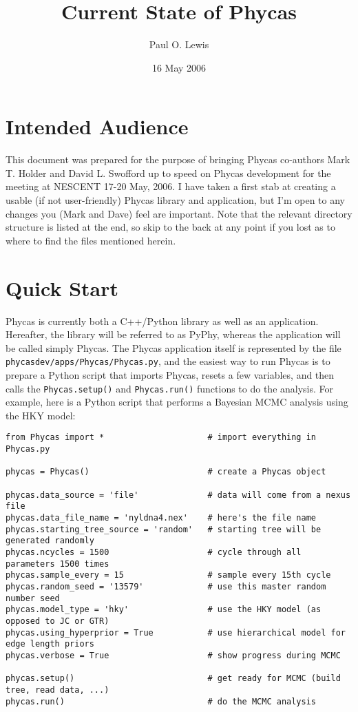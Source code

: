 \documentclass[10pt]{article}
\begin{document}
\title{Current State of Phycas}
\author{Paul O. Lewis} 
\date{16 May 2006}
\maketitle

\section{Intended Audience}

This document was prepared for the purpose of bringing Phycas co-authors Mark T. Holder and David L. Swofford up to speed on Phycas development for the meeting at NESCENT 17-20 May, 2006. I have taken a first stab at creating a usable (if not user-friendly) Phycas library and application, but I'm open to any changes you (Mark and Dave) feel are important. Note that the relevant directory structure is listed at the end, so skip to the back at any point if you lost as to where to find the files mentioned herein.

\section{Quick Start}

Phycas is currently both a C++/Python library as well as an application. Hereafter, the library will be referred to as PyPhy, whereas the application will be called simply Phycas. The Phycas application itself is represented by the file {\tt phycasdev/apps/Phycas/Phycas.py}, and the easiest way to run Phycas is to prepare a Python script that imports Phycas, resets a few variables, and then calls the \verb+Phycas.setup()+ and \verb+Phycas.run()+ functions to do the analysis. For example, here is a Python script that performs a Bayesian MCMC analysis using the HKY model:

\begin{verbatim}
from Phycas import *                     # import everything in Phycas.py

phycas = Phycas()                        # create a Phycas object

phycas.data_source = 'file'              # data will come from a nexus file
phycas.data_file_name = 'nyldna4.nex'    # here's the file name
phycas.starting_tree_source = 'random'   # starting tree will be generated randomly
phycas.ncycles = 1500                    # cycle through all parameters 1500 times
phycas.sample_every = 15                 # sample every 15th cycle
phycas.random_seed = '13579'             # use this master random number seed
phycas.model_type = 'hky'                # use the HKY model (as opposed to JC or GTR)
phycas.using_hyperprior = True           # use hierarchical model for edge length priors
phycas.verbose = True                    # show progress during MCMC

phycas.setup()                           # get ready for MCMC (build tree, read data, ...)
phycas.run()                             # do the MCMC analysis
\end{verbatim}
\end{document}
